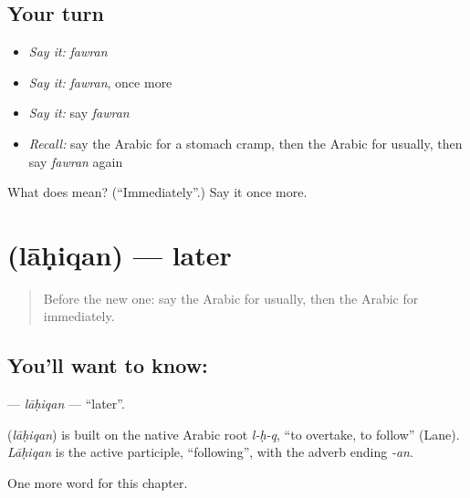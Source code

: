 \subsection*{Your turn}
\begin{itemize}
\raggedright
  \item \emph{Say it:} \emph{fawran}
  \item \emph{Say it:} \emph{fawran}, once more
  \item \emph{Say it:} say \emph{fawran}
  \item \emph{Recall:} say the Arabic for a stomach cramp, then the Arabic for usually, then say \emph{fawran} again
\end{itemize}

\begin{tcolorbox}[breakable,colback=teal!4,colframe=teal!35!black,title={Before you move on}]
What does  mean? (\textquotedblleft{}Immediately\textquotedblright{}.) Say it once more.
\end{tcolorbox}
\section[\texorpdfstring{\ar{لاحقا} (lāḥiqan)}{لاحقا (lāḥiqan)}]{ (lāḥiqan) — later}

\label{lesson:AR-C202-lahiqan}



\begin{quote}
Before the new one: say the Arabic for usually, then the Arabic for immediately.
\end{quote}

\subsection*{You'll want to know: }
\textbf{} — \emph{lāḥiqan} — \textquotedblleft{}later\textquotedblright{}.

\begin{cousinweb}
\textbf{} (\emph{lāḥiqan}) is built on the native Arabic root \emph{l-ḥ-q}, \textquotedblleft{}to overtake, to follow\textquotedblright{} (Lane). \emph{Lāḥiqan} is the active participle, \textquotedblleft{}following\textquotedblright{}, with the adverb ending \emph{-an}.
\end{cousinweb}

\begin{grammarlens}[title={What you've built}]
One more word for this chapter.
\end{grammarlens}

